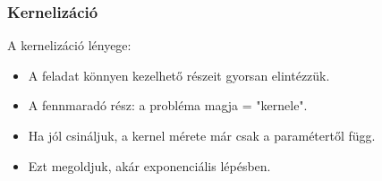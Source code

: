 \begin{frame}
\frametitle{Kernelizáció}

A kernelizáció lényege:
\begin{itemize}
\item A feladat könnyen kezelhető részeit gyorsan elintézzük.
\item A fennmaradó rész: a probléma magja = "kernele".
\item Ha jól csináljuk, a kernel mérete már csak a paramétertől függ.
\item Ezt megoldjuk, akár exponenciális lépésben.
\end{itemize}

\end{frame}

